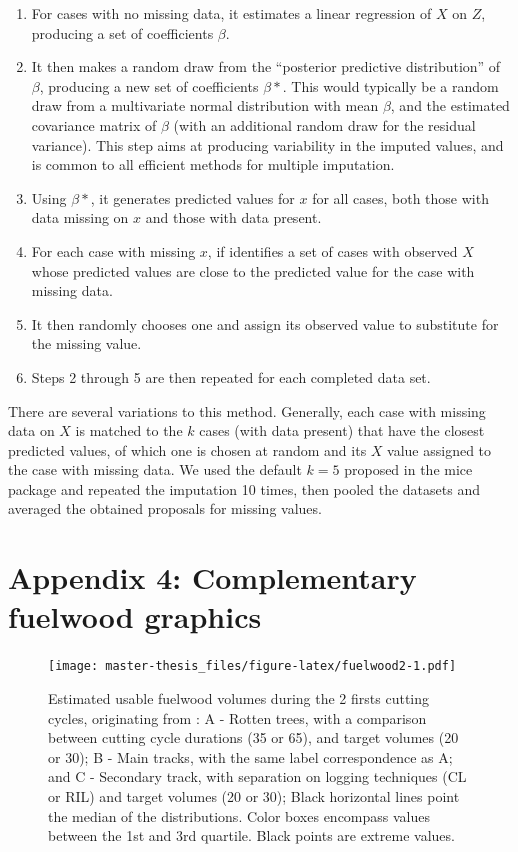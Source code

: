 \documentclass[12pt,]{article}
\providecommand{\tightlist}{%
\setlength{\itemsep}{0pt}\setlength{\parskip}{0pt}}
\let\oldsection\section
\renewcommand\section{\newpage\oldsection}
\theoremstyle{definition}
\theoremstyle{definition}
\theoremstyle{definition}
\theoremstyle{remark}
\begin{document}
\begin{enumerate}
\def\labelenumi{\arabic{enumi}.}
\tightlist
\item
  For cases with no missing data, it estimates a linear regression of
  \(X\) on \(Z\), producing a set of coefficients \(\beta\).
\item
  It then makes a random draw from the ``posterior predictive
  distribution'' of \(\beta\), producing a new set of coefficients
  \(\beta*\). This would typically be a random draw from a multivariate
  normal distribution with mean \(\beta\), and the estimated covariance
  matrix of \(\beta\) (with an additional random draw for the residual
  variance). This step aims at producing variability in the imputed
  values, and is common to all efficient methods for multiple
  imputation.
\item
  Using \(\beta*\), it generates predicted values for \(x\) for all
  cases, both those with data missing on \(x\) and those with data
  present.
\item
  For each case with missing \(x\), if identifies a set of cases with
  observed \(X\) whose predicted values are close to the predicted value
  for the case with missing data.
\item
  It then randomly chooses one and assign its observed value to
  substitute for the missing value.
\item
  Steps 2 through 5 are then repeated for each completed data set.
\end{enumerate}

There are several variations to this method. Generally, each case with
missing data on \(X\) is matched to the \(k\) cases (with data present)
that have the closest predicted values, of which one is chosen at random
and its \(X\) value assigned to the case with missing data. We used the
default \(k=5\) proposed in the mice package and repeated the imputation
10 times, then pooled the datasets and averaged the obtained proposals
for missing values.

\section{Appendix 4: Complementary fuelwood
graphics}\label{appendix-4-complementary-fuelwood-graphics}

\begin{figure}
\centering
\texttt{[image: master-thesis\_files/figure-latex/fuelwood2-1.pdf]}
\caption{\label{fig:fuelwood2}Estimated usable fuelwood volumes during the 2
firsts cutting cycles, originating from : A - Rotten trees, with a
comparison between cutting cycle durations (35 or 65), and target
volumes (20 or 30); B - Main tracks, with the same label correspondence
as A; and C - Secondary track, with separation on logging techniques (CL
or RIL) and target volumes (20 or 30); Black horizontal lines point the
median of the distributions. Color boxes encompass values between the
1st and 3rd quartile. Black points are extreme values.}
\end{figure}
\end{document}
